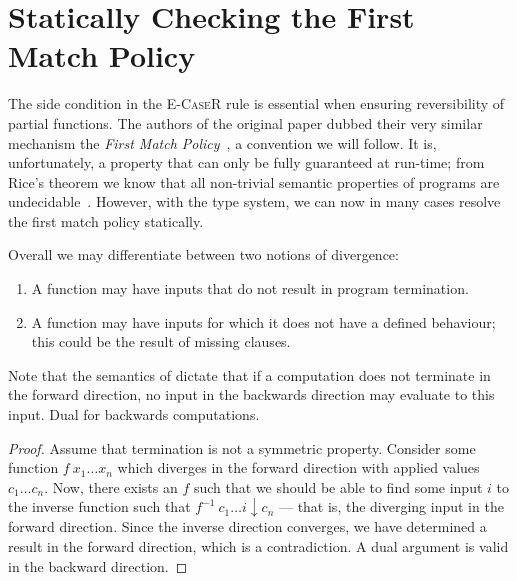 
\chapter{Statically Checking the First Match Policy}\label{sec:staticFMP}

The side condition in the \textsc{E-CaseR} rule is essential when ensuring
reversibility of partial functions. The authors of the original \rfun paper
dubbed their very similar mechanism the \emph{First Match
Policy}~\cite{YokoyamaAxelsenGlueck:2012:LNCS}, a convention we will follow. It
is, unfortunately, a property that can only be fully guaranteed at run-time;
from Rice's theorem we know that all non-trivial semantic properties of
programs are undecidable~\cite{Rice:1953}. However, with the type system, we
can now in many cases resolve the first match policy statically.

Overall we may differentiate between two notions of divergence:

\begin{enumerate}

  \item A function may have inputs that do not result in program termination.

  \item A function may have inputs for which it does not have a defined
    behaviour; this could be the result of missing clauses.

\end{enumerate}

Note that the semantics of \rfunc dictate that if a computation does not
terminate in the forward direction, no input in the backwards direction may
evaluate to this input. Dual for backwards computations.

\begin{proof}

  Assume that termination is not a symmetric property. Consider some function
  $f~x_1 \dots x_n$ which diverges in the forward direction with applied values
  $c_1 \dots c_n$. Now, there exists an $f$ such that we should be able to find
  some input $i$ to the inverse function such that $f^{-1}~c_1 \dots i
  \downarrow c_n$ --- that is, the diverging input in the forward direction.
  Since the inverse direction converges, we have determined a result in the
  forward direction, which is a contradiction. A dual argument is valid in the
  backward direction.

\end{proof}

